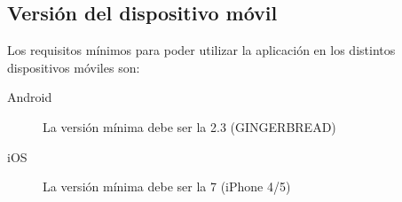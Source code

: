 \subsection{Versión del dispositivo móvil}
Los requisitos mínimos para poder utilizar la aplicación en los distintos dispositivos móviles son:
\begin{description}
\item[Android]  La versión mínima debe ser la 2.3 (GINGERBREAD)
\item[iOS] La versión mínima debe ser la 7 (iPhone 4/5)
\end{description}
